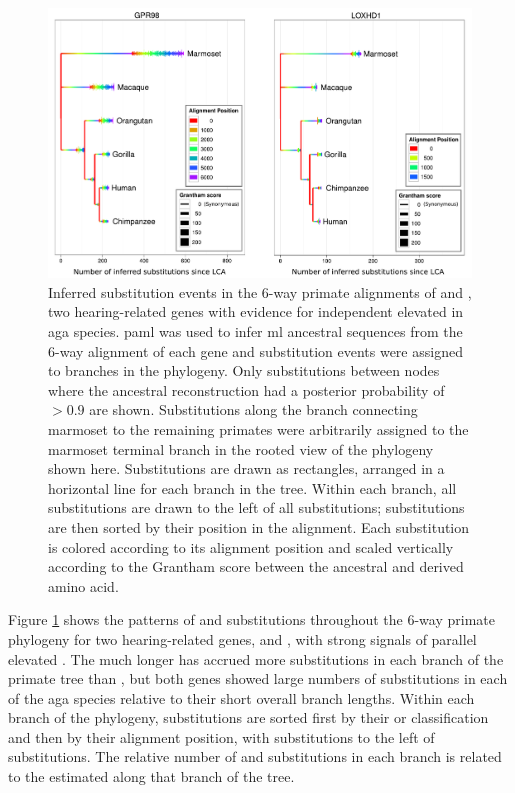 \begin{figure}
\centering
\includegraphics[scale=0.6]{Figs/gorilla_gpr98.pdf}
\caption{Inferred substitution events in the 6-way primate alignments
  of  and , two hearing-related genes with
  evidence for independent elevated \dnds in \ac{aga}
  species. \ac{paml} was used to infer \ac{ml} ancestral sequences
  \citep{Yang1995} from the 6-way alignment of each gene and
  substitution events were assigned to branches in the phylogeny. Only
  substitutions between nodes where the ancestral reconstruction had a
  posterior probability of $>0.9$ are shown. Substitutions along the
  branch connecting marmoset to the remaining primates were
  arbitrarily assigned to the marmoset terminal branch in the rooted
  view of the phylogeny shown here. Substitutions are drawn as
  rectangles, arranged in a horizontal line for each branch in the
  tree. Within each branch, all \syn substitutions are drawn to the
  left of all \nsyn substitutions; substitutions are then sorted by
  their position in the alignment. Each substitution is colored
  according to its alignment position and scaled vertically according
  to the Grantham score \citep{Grantham1974} between the ancestral and
  derived amino acid.}
\label{fig_gorilla_gpr98}
\end{figure}

Figure \ref{fig_gorilla_gpr98} shows the patterns of \nsyn and \syn
substitutions throughout the 6-way primate phylogeny for two
hearing-related genes,  and , with strong
signals of parallel elevated \dnds. The much longer  has
accrued more substitutions in each branch of the primate tree than
, but both genes showed large numbers of \nsyn
substitutions in each of the \ac{aga} species relative to their short
overall branch lengths. Within each branch of the phylogeny,
substitutions are sorted first by their \nsyn or \syn classification
and then by their alignment position, with \syn substitutions to the
left of \nsyn substitutions. The relative number of \nsyn and \syn
substitutions in each branch is related to the estimated \dnds along
that branch of the tree.

